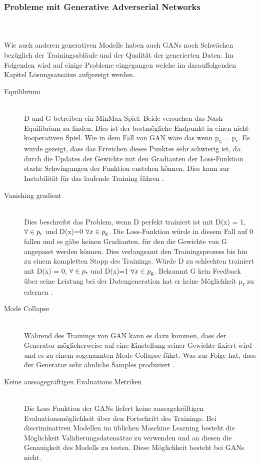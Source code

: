 \documentclass{llncs}
\begin{document}
\subsubsection{Probleme mit Generative Adverserial Networks}\label{sec:problemegan}
~\\\\
Wie auch anderen generativen Modelle haben auch GANs noch Schwächen bezüglich der Trainingsabläufe und der Qualität der generierten Daten. Im Folgenden wird auf einige Probleme eingegangen welche im darauffolgenden Kapitel Lösungsansätze aufgezeigt werden. 
\\
\begin{description}	
	
	\item[Equilibrium]
	~\\
	D und G betreiben ein MinMax Spiel. Beide versuchen das Nash Equilibrium zu finden. Dies ist der bestmögliche Endpunkt in einen nicht kooperativen Spiel. Wie in dem Fall von GAN wäre das wenn  p\textsubscript{g} = p\textsubscript{r}. Es wurde gezeigt, dass das Erreichen dieses Punktes sehr schwierig ist, da durch die Updates der Gewichte mit den Gradianten der Loss-Funktion starke Schwingungen der Funktion enstehen können. Dies kann zur Instabilität für das laufende Training führen \cite{improvingan}.   
	\\
	\item[Vanishing gradient]
	~\\
	Dies beschreibt das Problem, wenn D perfekt trainiert ist mit  D(x) = 1, $\forall \in p\textsubscript{r}$ und D(x)=0 $\forall x \in p \textsubscript{g}$. Die Loss-Funktion würde in diesem Fall auf 0 fallen und es gäbe keinen Gradianten, für den die Gewichte von G angepasst werden können. Dies verlangsamt den Trainingsprozess bis hin zu einem kompletten Stopp des Trainings. Würde D zu schlechten trainiert mit  D(x) = 0, $\forall \in p\textsubscript{r}$ und D(x)=1 $\forall x \in p \textsubscript{g}$. Bekommt G kein Feedback über seine Leistung bei der Datengeneration hat er keine Möglichkeit p\textsubscript{r} zu erlernen \cite{improvingan}.
	\\
	\item[Mode Collapse]
	~\\
	Während des Trainings von GAN kann es dazu kommen, dass der Generator möglicherweise auf eine Einstellung seiner Gewichte fixiert wird und es zu einem sogenannten Mode Collapse führt. Was zur Folge hat, dass der Generator sehr ähnliche Samples produziert \cite{wasserstein}.
	\\
	\item[Keine aussagegräftigen Evaluations Metriken]
	~\\
	Die Loss Funktion der GANs liefert keine aussagekräftigen Evaluationsmöglichkeit über den Fortschritt des Trainings. Bei  discriminativen Modellen im üblichen Maschine Learning besteht die Möglichkeit Validierungsdatensätze zu verwenden und an diesen die Genauigkeit des Modells zu testen. Diese Möglichkeit besteht bei GANs nicht\cite{metrics}.
\end{description}
\end{document}
